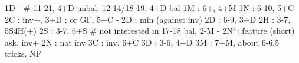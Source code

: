 1D -  # 11-21, 4+D unbal; 12-14/18-19, 4+D bal
1M : 6+, 4+M
1N : 6-10, 5+C
2C : inv+, 3+D ; or GF, 5+C
   - 2D : min (against inv)
2D : 6-9, 3+D
2H : 3-7, 5S4H(+)
2S : 3-7, 6+S  # not interested in 17-18 bal, 2-M
   - 2N*: feature (short) ask, inv+
2N : nat inv
3C : inv, 6+C
3D : 3-6, 4+D
3M : 7+M, about 6-6.5 tricks, NF